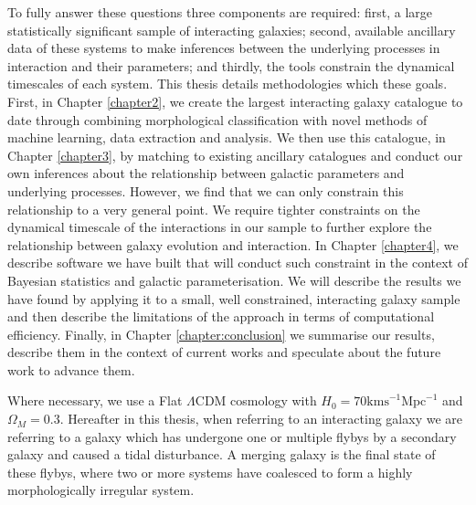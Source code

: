 To fully answer these questions three components are required: first, a large statistically significant sample of interacting galaxies; second, available ancillary data of these systems to make inferences between the underlying processes in interaction and their parameters; and thirdly, the tools \DIFaddbegin {}\DIFaddend constrain the dynamical timescales of each system. This thesis details methodologies which \DIFdelbegin {}\DIFdelend \DIFaddbegin {}\DIFaddend these goals. First, in Chapter \ref{chapter2}, we create the largest interacting galaxy catalogue to date through combining morphological classification with novel methods of machine learning, data extraction and analysis. We then use this catalogue, in Chapter \ref{chapter3}, by matching to existing ancillary catalogues and conduct our own inferences about the relationship between galactic parameters and underlying processes. However, we find that we can only constrain this relationship to a very general point. We require tighter constraints on the dynamical timescale of the interactions in our sample to further explore the relationship between galaxy evolution and interaction. In Chapter \ref{chapter4}, we describe software we have built that will conduct such constraint in the context of Bayesian statistics and galactic parameterisation. We will describe the results we have found by applying it to a small, well constrained, interacting galaxy sample and then describe the limitations of the approach in terms of computational efficiency. Finally, in Chapter \ref{chapter:conclusion} we summarise our results, describe them in the context of current works and speculate about the future work to advance them.

Where necessary, we use a Flat $\Lambda$CDM cosmology with $H_{0} = 70\mathrm{kms}^{-1}\mathrm{Mpc}^{-1}$ and $\Omega_{M} = 0.3$. Hereafter in this thesis, when referring to an interacting galaxy we are referring to a galaxy which has undergone one or multiple flybys by a secondary galaxy and caused a tidal disturbance. A merging galaxy is the final state of these flybys, where two or more systems have coalesced to form a highly morphologically irregular system.
